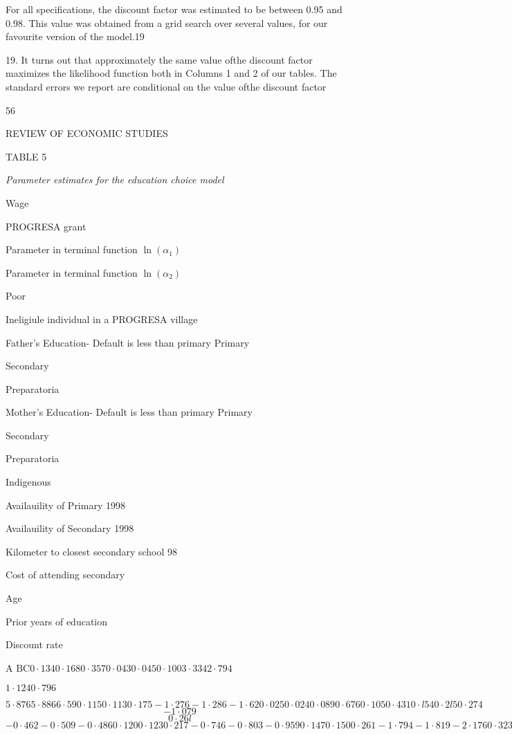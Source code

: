 For all specifications, the discount factor was estimated to be between 0.95 and 0.98. This value was obtained from a grid search over several values, for our favourite version of the model.19

19. It turns out that approximately the same value ofthe discount factor maximizes the likelihood function both in Columns 1 and 2 of our tables. The standard errors we report are conditional on the value ofthe discount factor

56

REVIEW OF ECONOMIC STUDIES

TABLE 5

{\it Parameter estimates for the education choice model}

Wage

PROGRESA grant

Parameter in terminal function $\ln(\alpha_{1})$

Parameter in terminal function $\ln(\alpha_{2})$

Poor

Ineligiule individual in a PROGRESA village

Father's Education- Default is less than primary Primary

Secondary

Preparatoria

Mother's Education- Default is less than primary Primary

Secondary

Preparatoria

Indigenous

Availauility of Primary 1998

Availauility of Secondary 1998

Kilometer to closest secondary school 98

Cost of attending secondary

Age

Prior years of education

Discount rate

A $\mathrm{B} \mathrm{C} 0\cdot 134 0\cdot 168 0\cdot 357 0\cdot 043 0\cdot 045 0\cdot 100 3\cdot 334 2\cdot 794$

$1\cdot 124 0\cdot 796$

$5\cdot 876 5\cdot 886 6\cdot 59 0\cdot 115 0\cdot 113 0\cdot 175 -1\cdot 276 -1\cdot 286 -1\cdot 62 0\cdot 025 0\cdot 024 0\cdot 089 0\cdot 676 0\cdot 105 0\cdot 431 0\cdot l54 0\cdot 2l5 0\cdot 274$
$$
-1\cdot 079
$$
$$
0\cdot 26l
$$
$-0\cdot 462 -0\cdot 509 -0\cdot 486 0\cdot 120 0\cdot 123 0\cdot 217 -0\cdot 746 -0\cdot 803 -0\cdot 959 0\cdot 147 0\cdot 150 0\cdot 261 -1\cdot 794 -1\cdot 819 -2\cdot 176 0\cdot 323 0\cdot 328 0\cdot 558$

